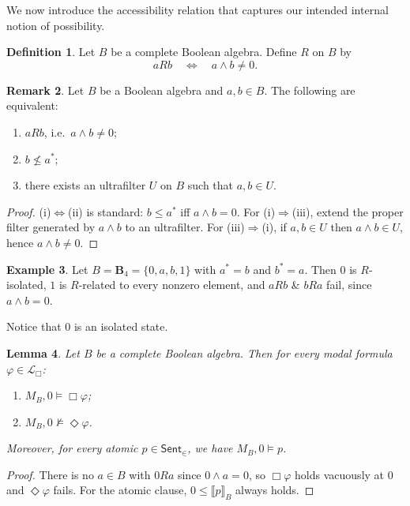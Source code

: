 \documentclass[11pt]{amsart}
\theoremstyle{definition}
\newtheorem{definition}{Definition}[section]
\newtheorem{example}[definition]{Example}
\newtheorem{remark}[definition]{Remark}
\theoremstyle{plain}
\newtheorem{lemma}[definition]{Lemma}
\newcommand{\Sent}{\mathsf{Sent}}
\newcommand{\Lbox}{\mathcal L_{\Box}} %
\newcommand{\val}[1]{\llbracket #1\rrbracket_B}
\newcommand{\Bfour}{\mathbf{B}_4}
\begin{document}
We now introduce the accessibility relation that captures our intended internal notion of possibility.

\begin{definition}\label{def:R}
Let $B$ be a complete Boolean algebra. Define $R$ on $B$ by
\[
aRb \quad\Longleftrightarrow\quad a\wedge b\neq 0.
\]
\end{definition}

\begin{remark}\label{rem:R-equivalences}
Let $B$ be a Boolean algebra and $a,b\in B$. The following are equivalent:
\begin{enumerate}[label=(\roman*)]
\item $aRb$, i.e.\ $a\wedge b\neq 0$;
\item $b\not\le a^{\ast}$;
\item there exists an ultrafilter $U$ on $B$ such that $a, b\in U$.
\end{enumerate}
\end{remark}

\begin{proof}
(i)$\Leftrightarrow$(ii) is standard: $b\le a^\ast$ iff $a\wedge b=0$.
For (i)$\Rightarrow$(iii), extend the proper filter generated by $a\wedge b$ to an ultrafilter.
For (iii)$\Rightarrow$(i), if $a,b\in U$ then $a\wedge b\in U$, hence $a\wedge b\neq 0$.
\end{proof}

\begin{example}
Let $B=\Bfour=\{0,a,b,1\}$ with $a^\ast=b$ and $b^\ast=a$.
Then $0$ is $R$-isolated, $1$ is $R$-related to every nonzero element, and $aRb$ \& $bRa$ fail, since $a\wedge b=0$.
\end{example}

Notice that $0$ is an isolated state.

\begin{lemma}\label{lem:state0}
Let $B$ be a complete Boolean algebra. Then for every modal formula $\varphi\in\Lbox$:
\begin{enumerate}[label=(\roman*)]
\item $M_B,0\models \Box\varphi$;
\item $M_B,0\not\models \Diamond\varphi$.
\end{enumerate}
Moreover, for every atomic $p\in\Sent_{\in}$, we have $M_B,0\models p$.
\end{lemma}

\begin{proof}
There is no $a\in B$ with $0Ra$ since $0\wedge a=0$, so $\Box\varphi$ holds vacuously at $0$ and $\Diamond\varphi$
fails. For the atomic clause, $0\le \val{p}$ always holds.
\end{proof}
\end{document}
